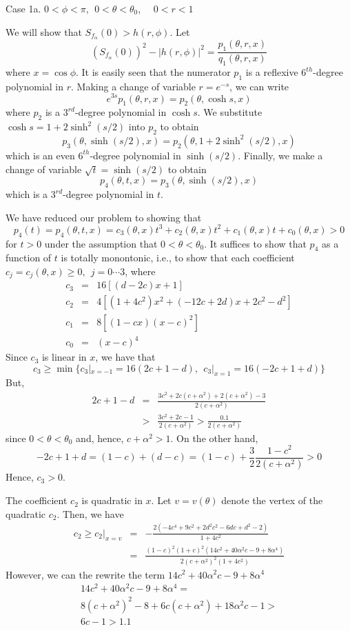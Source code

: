 \documentclass[12pt]{icgft}
\theoremstyle{definition}
\numberwithin{equation}{section}
\begin{document}
Case 1a.  $0 < \phi < \pi, \ \  0 < \theta < \theta_0 $, \ \ $0 < r < 1$

\vspace{0.1in}

We will show that $S_{f_{\alpha}}(0) > h(r,\phi)$.  Let
$$(S_{f_{\alpha}}(0))^2- |h(r,\phi)|^2 = \frac{p_1(\theta,r,x)}{q_1(\theta,r,x)}$$
\noindent where $x = \cos \phi$.  It is easily seen that the numerator $p_1$ is a
reflexive $6^{th}$-degree polynomial in $r$.
Making a change of  variable $r=e^{-s}$, we can write
$$e^{3s}p_1(\theta,r,x) = p_2(\theta,\cosh s,x)$$
\noindent where $p_2$ is a $3^{rd}$-degree polynomial in $\cosh s$. We substitute $\cosh s = 1 + 2 \sinh^2(s/2)$
into $p_2$ to obtain
$$ p_3(\theta,\sinh(s/2),x) = p_2(\theta,1 + 2 \sinh^2(s/2),x)$$
\noindent which is an even $6^{th}$-degree polynomial in $\sinh(s/2)$.  Finally, we
make a change of variable $\sqrt{t} = \sinh(s/2)$ to obtain
$$ p_4(\theta,t,x) = p_3(\theta,\sinh(s/2),x)$$
\noindent which is a $3^{rd}$-degree polynomial in $t$.

We have reduced our problem to showing that
$$p_4(t) = p_4(\theta,t,x) = c_3(\theta,x)t^3 + c_2(\theta,x)t^2
+ c_1(\theta,x)t  + c_0(\theta,x) > 0$$
\noindent for $t > 0$ under the assumption that $0 < \theta < \theta_0$.
It suffices to show that $p_4$ as a function of $t$ is totally monontonic,
i.e., to show that each coefficient $c_j = c_j(\theta,x) \ge 0, \ \
j=0 \cdots 3$, where
\begin{eqnarray*}
c_3 &=& 16[(d-2c)x + 1] \\
c_2 &=& 4[(1+4c^2)x^2 +(-12c+2d)x + 2c^2-d^2] \\
c_1 &=& 8[(1-cx)(x-c)^2]\\
c_0 &=& (x-c)^4
\end{eqnarray*}
Since $c_3$ is linear in $x$, we have that
$$c_3 \ge \min \{ {c_3}|_{x=-1} = 16(2c+1-d),\ \  {c_3}|_{x=1} = 16(-2c+1+d)\}$$
\noindent But,
\begin{eqnarray*}
2c+1-d &=& \frac{3c^2 + 2c(c+\alpha^2) + 2(c+\alpha^2) - 3}{2(c+\alpha^2)} \\
&>& \frac{3c^2 + 2c -1}{2(c+\alpha^2)} > \frac{0.1}{2(c+\alpha^2)}
\end{eqnarray*}
\noindent since $0 < \theta < \theta_0$ and, hence, $c+\alpha^2 > 1$. On the other hand,
$$-2c+1+d = (1-c) + (d-c) = (1-c) + \frac{3}{2}\frac{1-c^2}{2(c+\alpha^2)} > 0$$
\noindent Hence, $c_3 > 0$.

The coefficient $c_2$ is quadratic in $x$.  Let $v = v(\theta)$ denote the vertex
of the quadratic $c_2$.  Then, we have
\begin{eqnarray*}
c_2 \ge {c_2}|_{x=v} &=& -\frac{2(-4c^4 + 9c^2 + 2d^2 c^2 - 6dc + d^2 - 2)}{1+4c^2} \\
&=& \frac{(1-c)^2(1+c)^2(14c^2 + 40\alpha^2 c - 9 + 8\alpha^4)}{2(c+\alpha^2)^2(1+4c^2)}
\end{eqnarray*}
\noindent However, we can the rewrite the term $14c^2 + 40\alpha^2c - 9 + 8\alpha^4$
\begin{eqnarray*}
14c^2 + 40\alpha^2c - 9 + 8\alpha^4 = \\
8(c+\alpha^2)^2 - 8 + 6c(c+\alpha^2) + 18\alpha^2c -1 > \\
6c-1 > 1.1
\end{eqnarray*}
\end{document}
